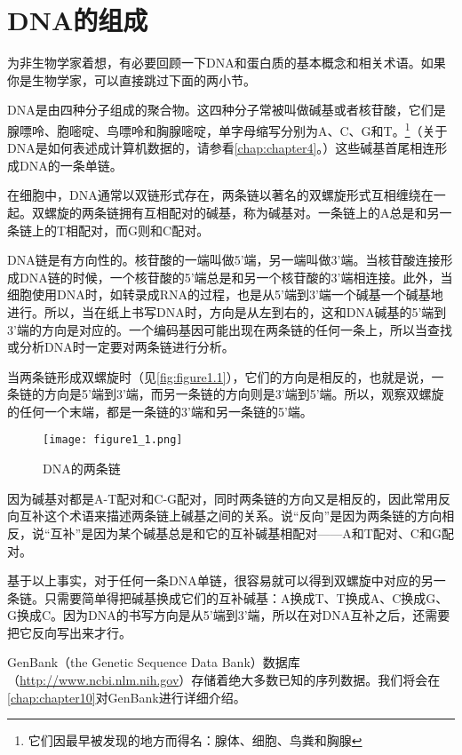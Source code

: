\section{DNA的组成}
为非生物学家着想，有必要回顾一下DNA和蛋白质的基本概念和相关术语。如果你是生物学家，可以直接跳过下面的两小节。

DNA是由四种分子组成的聚合物。这四种分子常被叫做碱基或者核苷酸，它们是腺嘌呤、胞嘧啶、鸟嘌呤和胸腺嘧啶，单字母缩写分别为A、C、G和T。\footnote{它们因最早被发现的地方而得名：腺体、细胞、鸟粪和胸腺}（关于DNA是如何表述成计算机数据的，请参看\autoref{chap:chapter4}。）这些碱基首尾相连形成DNA的一条单链。

在细胞中，DNA通常以双链形式存在，两条链以著名的双螺旋形式互相缠绕在一起。双螺旋的两条链拥有互相配对的碱基，称为碱基对。一条链上的A总是和另一条链上的T相配对，而G则和C配对。

DNA链是有方向性的。核苷酸的一端叫做5'端，另一端叫做3'端。当核苷酸连接形成DNA链的时候，一个核苷酸的5'端总是和另一个核苷酸的3'端相连接。此外，当细胞使用DNA时，如转录成RNA的过程，也是从5'端到3'端一个碱基一个碱基地进行。所以，当在纸上书写DNA时，方向是从左到右的，这和DNA碱基的5'端到3'端的方向是对应的。一个编码基因可能出现在两条链的任何一条上，所以当查找或分析DNA时一定要对两条链进行分析。

当两条链形成双螺旋时（见\autoref{fig:figure1.1}），它们的方向是相反的，也就是说，一条链的方向是5'端到3'端，而另一条链的方向则是3'端到5'端。所以，观察双螺旋的任何一个末端，都是一条链的3'端和另一条链的5'端。

\begin{figure}
  \centering
  \texttt{[image: figure1\_1.png]}
  \caption{DNA的两条链}
  \label{fig:figure1.1}
\end{figure}

因为碱基对都是A-T配对和C-G配对，同时两条链的方向又是相反的，因此常用反向互补这个术语来描述两条链上碱基之间的关系。说“反向”是因为两条链的方向相反，说“互补”是因为某个碱基总是和它的互补碱基相配对——A和T配对、C和G配对。

基于以上事实，对于任何一条DNA单链，很容易就可以得到双螺旋中对应的另一条链。只需要简单得把碱基换成它们的互补碱基：A换成T、T换成A、C换成G、G换成C。因为DNA的书写方向是从5'端到3'端，所以在对DNA互补之后，还需要把它反向写出来才行。

GenBank（the Genetic Sequence Data Bank）数据库（\href{http://www.ncbi.nlm.nih.gov}{http://www.ncbi.nlm.nih.gov}）存储着绝大多数已知的序列数据。我们将会在\autoref{chap:chapter10}对GenBank进行详细介绍。

